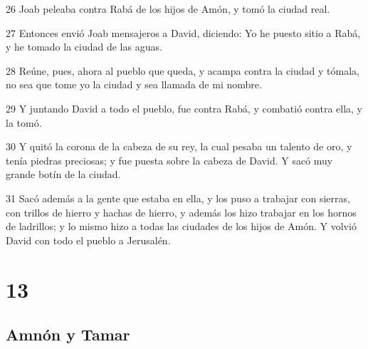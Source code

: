 \par 26 Joab peleaba contra Rabá de los hijos de Amón, y tomó la ciudad real.
\par 27 Entonces envió Joab mensajeros a David, diciendo: Yo he puesto sitio a Rabá, y he tomado la ciudad de las aguas.
\par 28 Reúne, pues, ahora al pueblo que queda, y acampa contra la ciudad y tómala, no sea que tome yo la ciudad y sea llamada de mi nombre.
\par 29 Y juntando David a todo el pueblo, fue contra Rabá, y combatió contra ella, y la tomó.
\par 30 Y quitó la corona de la cabeza de su rey, la cual pesaba un talento de oro,  y tenía piedras preciosas; y fue puesta sobre la cabeza de David. Y sacó muy grande botín de la ciudad.
\par 31 Sacó además a la gente que estaba en ella, y los puso a trabajar con sierras, con trillos de hierro y hachas de hierro, y además los hizo trabajar en los hornos de ladrillos; y lo mismo hizo a todas las ciudades de los hijos de Amón. Y volvió David con todo el pueblo a Jerusalén.

\chapter{13}

\section*{Amnón y Tamar}


